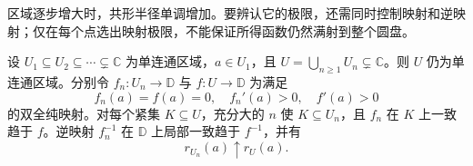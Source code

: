 \ProseParagraphBreak

区域逐步增大时，共形半径单调增加。要辨认它的极限，还需同时控制映射和逆映射；仅在每个点选出映射极限，不能保证所得函数仍然满射到整个圆盘。

\begin{proposition}[递增区域的归一化映射]\label{b3:prop:05-exhaustion-maps}
设 \(U_1\subseteq U_2\subseteq\cdots\subsetneq\mathbb C\) 为单连通区域，\(a\in U_1\)，且 \(U=\bigcup_{n\ge1}U_n\subsetneq\mathbb C\)。则 \(U\) 仍为单连通区域。分别令 \(f_n:U_n\rightarrow\mathbb D\) 与 \(f:U\rightarrow\mathbb D\) 为满足
\[
 f_n(a)=f(a)=0,\quad f_n'(a)>0,\quad f'(a)>0
\]
的双全纯映射。对每个紧集 \(K\subseteq U\)，充分大的 \(n\) 使 \(K\subseteq U_n\)，且 \(f_n\) 在 \(K\) 上一致趋于 \(f\)。逆映射 \(f_n^{-1}\) 在 \(\mathbb D\) 上局部一致趋于 \(f^{-1}\)，并有
\[
 r_{U_n}(a)\uparrow r_U(a).
\]
\end{proposition}
